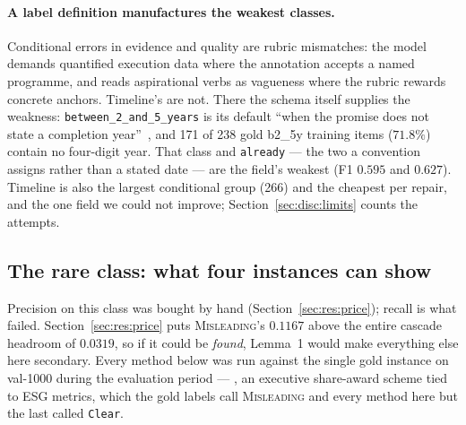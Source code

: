 \paragraph{A label definition manufactures the weakest classes.}
Conditional errors in evidence and quality are rubric mismatches: the model demands quantified
execution data where the annotation accepts a named programme, and reads aspirational verbs as
vagueness where the rubric rewards concrete anchors. Timeline's are not. There the schema itself
supplies the weakness: \texttt{between\_2\_and\_5\_years} is its default ``when the promise does
not state a completion year''~\cite{seki2025mlpromise}, and 171 of 238 gold b2\_5y training items
($71.8\%$) contain no four-digit year. That class and \texttt{already} --- the two a convention
assigns rather than a stated date --- are the field's weakest (F1 $0.595$ and $0.627$). Timeline
is also the largest conditional group (266) and the cheapest per repair, and the one field we
could not improve; Section~\ref{sec:disc:limits} counts the attempts.

\subsection{The rare class: what four instances can show}
\label{sec:errors:mis}

Precision on this class was bought by hand (Section~\ref{sec:res:price}); recall is what failed.
Section~\ref{sec:res:price} puts \textsc{Misleading}'s $0.1167$ above the entire cascade headroom
of $0.0319$, so if it could be \emph{found}, Lemma~1 would make everything else here secondary.
Every method below was run against the single gold instance on val-1000 during the evaluation
period --- , an executive
share-award scheme tied to ESG metrics, which the gold labels call \textsc{Misleading} and every
method here but the last called \texttt{Clear}.

